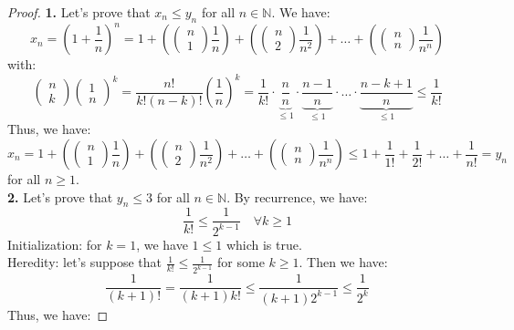 \begin{proof}
    \textbf{1.} Let's prove that \( x_n \leq y_n \) for all \( n \in \mathbb{N} \). We have:
    \[
        x_n = (1 + \frac{1}{n})^n = 1 + (\begin{pmatrix}n \\ 1
        \end{pmatrix} \frac{1}{n}) + (\begin{pmatrix}n \\ 2
        \end{pmatrix} \frac{1}{n^2}) + \ldots + (\begin{pmatrix}n \\ n
        \end{pmatrix} \frac{1}{n^n})
    \]
    with:
    \[ \begin{pmatrix}n \\ k
    \end{pmatrix} \begin{pmatrix}
        1 \\ n
    \end{pmatrix}^k = \frac{n!}{k! (n - k)!} \left(\frac{1}{n}\right)^k = \frac{1}{k!} \cdot \underbrace{\frac{n}{n}}_{\leq 1} \cdot \underbrace{\frac{n-1}{n}}_{\leq 1} \cdot \ldots \cdot \underbrace{\frac{n-k+1}{n}}_{\leq 1} \leq \frac{1}{k!} \]
    Thus, we have:
    \[
        x_n = 1 + (\begin{pmatrix}n \\ 1
        \end{pmatrix} \frac{1}{n}) + (\begin{pmatrix}n \\ 2
        \end{pmatrix} \frac{1}{n^2}) + \ldots + (\begin{pmatrix}n \\ n
        \end{pmatrix} \frac{1}{n^n}) \leq 1 + \frac{1}{1!} + \frac{1}{2!} + \ldots + \frac{1}{n!} = y_n
    \]
    for all \( n \geq 1 \). \\
    \textbf{2.} Let's prove that \( y_n \leq 3 \) for all \( n \in \mathbb{N} \). By recurrence, we have:
    \[
        \frac{1}{k!} \leq \frac{1}{2^{k - 1}} \quad \forall k \geq 1
    \]
    Initialization: for \( k = 1 \), we have \( 1 \leq 1 \) which is true. \\
    Heredity: let's suppose that \( \frac{1}{k!} \leq \frac{1}{2^{k - 1}} \) for some \( k \geq 1 \). Then we have:
    \[ \frac{1}{(k + 1)!} = \frac{1}{(k + 1) k!} \leq \frac{1}{(k + 1) 2^{k - 1}} \leq \frac{1}{2^k} \]
    Thus, we have:

\end{proof}
